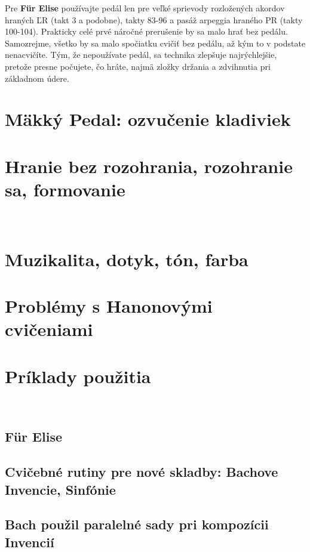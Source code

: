 \documentclass[11pt,a4paper]{book}
\begin{document}
Pre \textbf{Für Elise} používajte pedál len pre veľké sprievody rozložených akordov hraných ĽR (takt 3 a podobne), takty 83-96 a pasáž arpeggia hraného PR (takty 100-104). Prakticky celé prvé náročné prerušenie by sa malo hrať bez pedálu. Samozrejme, všetko by sa malo spočiatku cvičiť bez pedálu, až kým to v podstate nenacvičíte. Tým, že nepoužívate pedál, sa technika zlepšuje najrýchlejšie, pretože presne počujete, čo hráte, najmä zložky držania a zdvihnutia pri základnom údere.

\section{Mäkký Pedal: ozvučenie kladiviek}\label{s:soft-pedal}

\section{Hranie bez rozohrania, rozohranie sa, formovanie}\label{s:playing-cold}
\ 
\section{Muzikalita, dotyk, tón, farba}\label{s:musicality}

\section{Problémy s Hanonovými cvičeniami}\label{s:problems-hanon}

\section{Príklady použitia}\label{s:examples-applications}
\ 
\subsection{Für Elise}\label{s:fur-elise}

\subsection{Cvičebné rutiny pre nové skladby: Bachove Invencie, Sinfónie}\label{s:bach-inventions}

\subsection{Bach použil paralelné sady pri kompozícii Invencií}\label{s:bach-sets}
\end{document}
